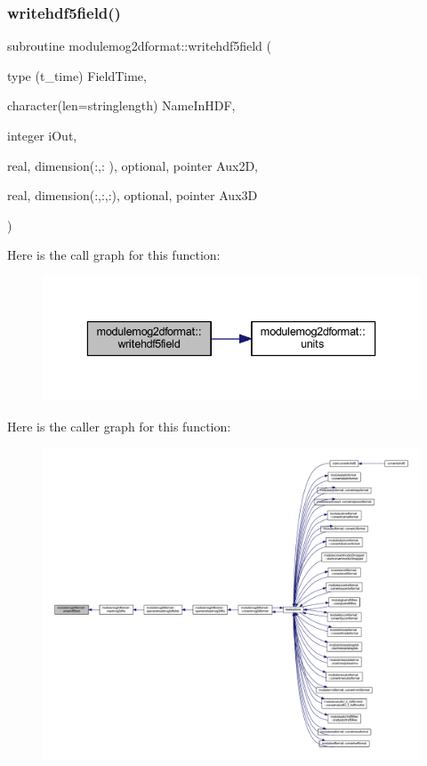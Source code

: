 \subsubsection{\texorpdfstring{writehdf5field()}{writehdf5field()}}
{\footnotesize\ttfamily subroutine modulemog2dformat\+::writehdf5field (\begin{DoxyParamCaption}\item[{type (t\+\_\+time)}]{Field\+Time,  }\item[{character(len=stringlength)}]{Name\+In\+H\+DF,  }\item[{integer}]{i\+Out,  }\item[{real, dimension(\+:,\+:  ), optional, pointer}]{Aux2D,  }\item[{real, dimension(\+:,\+:,\+:), optional, pointer}]{Aux3D }\end{DoxyParamCaption})\hspace{0.3cm}{\ttfamily [private]}}

Here is the call graph for this function\+:\nopagebreak
\begin{figure}[H]
\begin{center}
\leavevmode
\includegraphics[width=336pt]{namespacemodulemog2dformat_acbf2158af081eb0e8e9996387d7dfd5f_cgraph}
\end{center}
\end{figure}
Here is the caller graph for this function\+:\nopagebreak
\begin{figure}[H]
\begin{center}
\leavevmode
\includegraphics[width=350pt]{namespacemodulemog2dformat_acbf2158af081eb0e8e9996387d7dfd5f_icgraph}
\end{center}
\end{figure}


